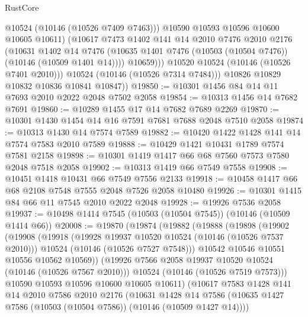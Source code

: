 \begin{lexlean}{RustCore}
\begin{coremodule}
                    @10524
                    (@10146 (@10526 @7409 @7463)))
                  @10590
                  @10593
                  @10596
                  @10600
                  @10605
                  @10611)
                (@10617
                  @7473
                  @1402
                  @141
                  @14
                  @2010
                  @7476
                  @2010
                  @2176
                  (@10631
                    @1402
                    @14
                    @7476
                    (@10635 @1401 @7476 (@10503 (@10504 @7476)) (@10146 (@10509 @1401 @14))))
                  @10659)))
            @10520
            @10524
            (@10146 (@10526 @7401 @2010)))
          @10524
          (@10146 (@10526 @7314 @7484)))
        @10826
        @10829
        @10832
        @10836
        @10841
        @10847))
@19850 := @10301 @1456 @84 @14 @11 @7693 @2010 @2022 @2048 @7502 @2058
@19854 := @10313 @1456 @14 @7682 @7691
@19860 := @10289 @1455 @17 @14 @7682 @7689 @2269
@19870 := @10301 @1430 @1454 @14 @16 @7591 @7681 @7688 @2048 @7510 @2058
@19874 := @10313 @1430 @14 @7574 @7589
@19882 := @10420 @1422 @1428 @141 @14 @7574 @7583 @2010 @7589
@19888 := @10429 @1421 @10431 @1789 @7574 @7581 @2158
@19898 := @10301 @1419 @1417 @66 @68 @7560 @7573 @7580 @2048 @7518 @2058
@19902 := @10313 @1419 @66 @7549 @7558
@19908 := @10451 @1418 @10431 @66 @7549 @7556 @2133
@19918 := @10458 @1417 @66 @68 @2108 @7548 @7555 @2048 @7526 @2058 @10480
@19926 := @10301 @1415 @84 @66 @11 @7545 @2010 @2022 @2048
@19928 := @19926 @7536 @2058
@19937 := @10498 @1414 @7545 (@10503 (@10504 @7545)) (@10146 (@10509 @1414 @66))
@20008 := @19870
    (@19874
      (@19882
        (@19888
          (@19898
            (@19902
              (@19908
                (@19918
                  (@19928 @19937 @10520 @10524 (@10146 (@10526 @7537 @2010)))
                  @10524
                  (@10146 (@10526 @7527 @7548)))
                @10542
                @10546
                @10551
                @10556
                @10562
                @10569))
            (@19926 @7566 @2058 @19937 @10520 @10524 (@10146 (@10526 @7567 @2010)))
            @10524
            (@10146 (@10526 @7519 @7573)))
          @10590
          @10593
          @10596
          @10600
          @10605
          @10611)
        (@10617
          @7583
          @1428
          @141
          @14
          @2010
          @7586
          @2010
          @2176
          (@10631
            @1428
            @14
            @7586
            (@10635 @1427 @7586 (@10503 (@10504 @7586)) (@10146 (@10509 @1427 @14))))

\end{coremodule}
\end{lexlean}
